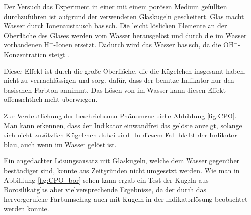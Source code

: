 

Der Versuch das \COTm Experiment in einer mit einem porösen Medium gefüllten \HSC durchzuführen ist aufgrund der verwendeten Glaskugeln gescheitert. Glas macht Wasser durch Ionenaustausch basisch. Die leicht löslichen Elemente an der Oberfläche des Glases werden vom Wasser herausgelöst und durch die im Wasser vorhandenen H$^+$-Ionen ersetzt. Dadurch wird das Wasser basisch, da die OH$^-$-Konzentration steigt \citep{Vogel}.

Dieser Effekt ist durch die große Oberfläche, die die Kügelchen insgesamt haben, nicht zu vernachlässigen und sorgt dafür, dass der benutze Indikator nur den basischen Farbton annimmt. Das Lösen von \COT im Wasser kann diesen Effekt offensichtlich nicht überwiegen.

Zur Verdeutlichung der beschriebenen Phänomene siehe Abbildung \ref{fig:CPO}. Man kann erkennen, dass der Indikator einwandfrei das gelöste \COT anzeigt, solange sich nicht zusätzlich Kügelchen dabei sind. In diesem Fall bleibt der Indikator blau, auch wenn \COT im Wasser gelöst ist.

Ein angedachter Lösungsansatz mit Glaskugeln, welche dem Wasser gegenüber beständiger sind, konnte aus Zeitgründen nicht umgesetzt werden. Wie man in Abbildung \ref{fig:CPO_bor} sehen kann ergab ein Test der Kugeln aus Borosilikatglas aber vielversprechende Ergebnisse, da der durch das \COT hervorgerufene Farbumschlag auch mit Kugeln in der Indikatorlösung beobachtet werden konnte.




  

